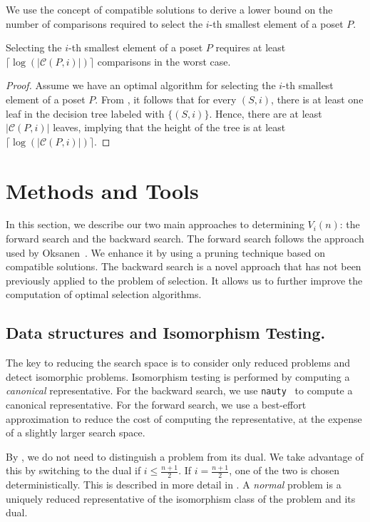 \documentclass[twoside,leqno,twocolumn]{article}
\begin{document}
We use the concept of compatible solutions to derive a lower bound on the number of comparisons required to select the $i$-th smallest element of a poset $P$.

\begin{theorem}\label{theorem:compatible_log}
  Selecting the $i$-th smallest element of a poset $P$ requires at least $\lceil\log(|\mathcal{C}(P, i)|)\rceil$ comparisons in the worst case.
\end{theorem}

\begin{proof}
  Assume we have an optimal algorithm for selecting the $i$-th smallest element of a poset $P$.
  From , it follows that for every $(S, i)$, there is at least one leaf in the decision tree labeled with $\{(S, i)\}$.
  Hence, there are at least $|\mathcal{C}(P, i)|$ leaves, implying that the height of the tree is at least $\lceil\log(|\mathcal{C}(P, i)|)\rceil$.
\end{proof}


\section{Methods and Tools}

In this section, we describe our two main approaches to determining $V_i(n)$: the forward search and the backward search.
The forward search follows the approach used by Oksanen~\cite{Oksanen2006}.
We enhance it by using a pruning technique based on compatible solutions.
The backward search is a novel approach that has not been previously applied to the problem of selection.
It allows us to further improve the computation of optimal selection algorithms.

\subsection{Data structures and Isomorphism Testing.}
The key to reducing the search space is to consider only reduced problems and detect isomorphic problems.
Isomorphism testing is performed by computing a \emph{canonical} representative.
For the backward search, we use \texttt{nauty}~\cite{MCKAY201494} to compute a canonical representative.
For the forward search, we use a best-effort approximation to reduce the cost of computing the representative, at the expense of a slightly larger search space.

By , we do not need to distinguish a problem from its dual.
We take advantage of this by switching to the dual if $i \leq \frac{n+1}{2}$.
If $i = \frac{n+1}{2}$, one of the two is chosen deterministically.
This is described in more detail in .
A \emph{normal} problem is a uniquely reduced representative of the isomorphism class of the problem and its dual.
\end{document}
